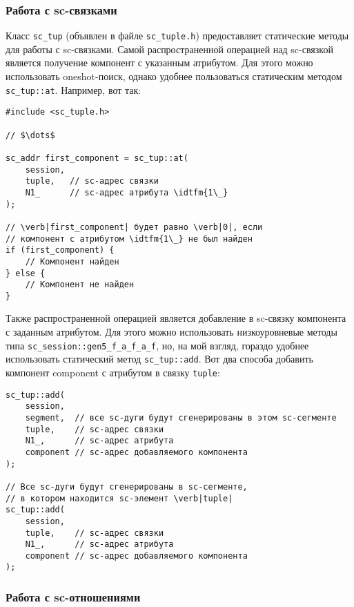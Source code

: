 \subsubsection{Работа с sc-связками}
\label{sec:libsc_sc_tup}

Класс \lstinline|sc_tup| (объявлен в файле \verb|sc_tuple.h|)
предоставляет статические методы для работы с sc-связками. Самой
распространенной операцией над sc-связкой является получение компонент
с указанным атрибутом. Для этого можно использовать oneshot-поиск,
однако удобнее пользоваться статическим методом
\lstinline|sc_tup::at|. Например, вот так:

\begin{lstlisting}[texcl]
#include <sc_tuple.h>

// $\dots$

sc_addr first_component = sc_tup::at(
    session,
    tuple,   // sc-адрес связки
    N1_      // sc-адрес атрибута \idtfm{1\_}
);

// \verb|first_component| будет равно \verb|0|, если
// компонент с атрибутом \idtfm{1\_} не был найден
if (first_component) {
    // Компонент найден
} else {
    // Компонент не найден
}
\end{lstlisting}

Также распространенной операцией является добавление в sc-связку
компонента с заданным атрибутом. Для этого можно использовать
низкоуровневые методы типа \lstinline|sc_session::gen5_f_a_f_a_f|, но, на мой
взгляд, гораздо удобнее использовать статический метод
\lstinline|sc_tup::add|. Вот два способа добавить компонент component с атрибутом
 в связку \lstinline|tuple|:

\begin{lstlisting}[texcl]
sc_tup::add(
    session,
    segment,  // все sc-дуги будут сгенерированы в этом sc-сегменте
    tuple,    // sc-адрес связки
    N1_,      // sc-адрес атрибута
    component // sc-адрес добавляемого компонента
);

// Все sc-дуги будут сгенерированы в sc-сегменте,
// в котором находится sc-элемент \verb|tuple|
sc_tup::add(
    session,
    tuple,    // sc-адрес связки
    N1_,      // sc-адрес атрибута
    component // sc-адрес добавляемого компонента
);
\end{lstlisting}

\subsubsection{Работа с sc-отношениями}
\label{sec:libsc_sc_rel}

